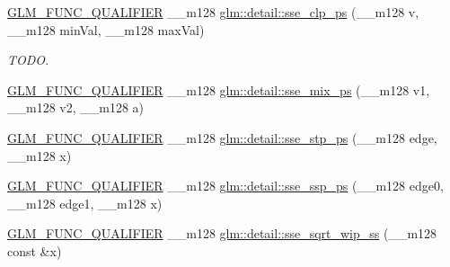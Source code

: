 \begin{DoxyCompactItemize}
\item 
\hyperlink{setup_8hpp_a33fdea6f91c5f834105f7415e2a64407}{G\+L\+M\+\_\+\+F\+U\+N\+C\+\_\+\+Q\+U\+A\+L\+I\+F\+I\+ER} \+\_\+\+\_\+m128 \hyperlink{namespaceglm_1_1detail_a7449dbce48a49880189874273179f3d2}{glm\+::detail\+::sse\+\_\+clp\+\_\+ps} (\+\_\+\+\_\+m128 v, \+\_\+\+\_\+m128 min\+Val, \+\_\+\+\_\+m128 max\+Val)
\begin{DoxyCompactList}\small\item\em T\+O\+DO. \end{DoxyCompactList}\item 
\hyperlink{setup_8hpp_a33fdea6f91c5f834105f7415e2a64407}{G\+L\+M\+\_\+\+F\+U\+N\+C\+\_\+\+Q\+U\+A\+L\+I\+F\+I\+ER} \+\_\+\+\_\+m128 \hyperlink{namespaceglm_1_1detail_af1b5b805a3dd439d6fbe92033f4d3bbd}{glm\+::detail\+::sse\+\_\+mix\+\_\+ps} (\+\_\+\+\_\+m128 v1, \+\_\+\+\_\+m128 v2, \+\_\+\+\_\+m128 a)
\item 
\hyperlink{setup_8hpp_a33fdea6f91c5f834105f7415e2a64407}{G\+L\+M\+\_\+\+F\+U\+N\+C\+\_\+\+Q\+U\+A\+L\+I\+F\+I\+ER} \+\_\+\+\_\+m128 \hyperlink{namespaceglm_1_1detail_a7287773c37d9f5900db40f7a783f689c}{glm\+::detail\+::sse\+\_\+stp\+\_\+ps} (\+\_\+\+\_\+m128 edge, \+\_\+\+\_\+m128 x)
\item 
\hyperlink{setup_8hpp_a33fdea6f91c5f834105f7415e2a64407}{G\+L\+M\+\_\+\+F\+U\+N\+C\+\_\+\+Q\+U\+A\+L\+I\+F\+I\+ER} \+\_\+\+\_\+m128 \hyperlink{namespaceglm_1_1detail_a66b096ea09da5b585484550d41da1580}{glm\+::detail\+::sse\+\_\+ssp\+\_\+ps} (\+\_\+\+\_\+m128 edge0, \+\_\+\+\_\+m128 edge1, \+\_\+\+\_\+m128 x)
\item 
\hyperlink{setup_8hpp_a33fdea6f91c5f834105f7415e2a64407}{G\+L\+M\+\_\+\+F\+U\+N\+C\+\_\+\+Q\+U\+A\+L\+I\+F\+I\+ER} \+\_\+\+\_\+m128 \hyperlink{namespaceglm_1_1detail_a93e21a07df0aa5e5a090fcb3ca513b91}{glm\+::detail\+::sse\+\_\+sqrt\+\_\+wip\+\_\+ss} (\+\_\+\+\_\+m128 const \&x)
\end{DoxyCompactItemize}
